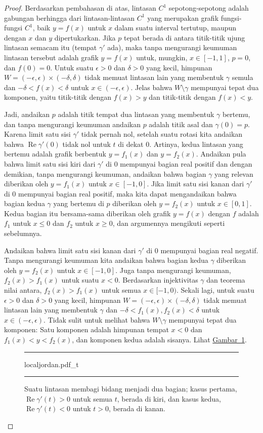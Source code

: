 \documentclass[12pt,openany]{book}
\renewcommand{\Re}{\operatorname{Re}}
\theoremstyle{plain}
\theoremstyle{remark}
\theoremstyle{definition}
\newenvironment{myfig}{%
\begin{figure}[h!t]
\noindent\rule{\textwidth}{0.5pt}\vspace{12pt}\par\centering}%
{\par\noindent\rule{\textwidth}{0.5pt}
\end{figure}}
\theoremstyle{exercise}
\theoremstyle{example}
\newcommand{\figureref}[1]{\hyperref[#1]{Gambar~\ref*{#1}}}
\begin{document}
\begin{proof}
Berdasarkan pembahasan di atas, lintasan $C^1$ sepotong-sepotong adalah gabungan berhingga dari lintasan-lintasan $C^1$
yang merupakan grafik fungsi-fungsi $C^1$, baik $y=f(x)$
untuk $x$ dalam suatu interval tertutup, maupun dengan $x$ dan $y$ dipertukarkan.
Jika $p$ tepat berada di antara titik-titik ujung lintasan semacam itu (tempat $\gamma'$ ada),
maka tanpa mengurangi keumuman lintasan tersebut adalah grafik $y=f(x)$ untuk, mungkin,
$x \in [-1,1]$, $p=0$, dan $f(0)=0$.
Untuk suatu $\epsilon > 0$ dan $\delta > 0$ yang kecil,
himpunan $W = (-\epsilon,\epsilon) \times (-\delta,\delta)$
tidak memuat lintasan lain yang membentuk $\gamma$ semula dan $-\delta < f(x) <
\delta$ untuk $x \in (-\epsilon,\epsilon)$. Jelas bahwa
$W \setminus \gamma$ mempunyai tepat dua komponen,
yaitu titik-titik dengan $f(x) > y$ dan titik-titik dengan $f(x) < y$.

Jadi, andaikan $p$ adalah titik tempat dua lintasan yang membentuk $\gamma$
bertemu, dan tanpa mengurangi keumuman andaikan $p$ adalah titik asal dan 
$\gamma(0) = p$.
Karena limit satu sisi $\gamma'$ tidak pernah nol, setelah
suatu rotasi kita andaikan bahwa $\Re \gamma'(0)$ tidak nol untuk 
$t$ di dekat $0$.
Artinya, kedua
lintasan yang bertemu adalah grafik berbentuk $y=f_1(x)$ dan $y=f_2(x)$.
Andaikan pula bahwa limit satu sisi
kiri dari $\gamma'$ di $0$ mempunyai bagian real positif dan dengan demikian,
tanpa mengurangi keumuman, andaikan bahwa
bagian $\gamma$ yang relevan diberikan oleh $y=f_1(x)$
untuk $x \in [-1,0]$.
Jika limit satu sisi kanan dari $\gamma'$ di $0$ mempunyai bagian real positif,
maka kita dapat mengandaikan bahwa bagian kedua $\gamma$
yang bertemu di $p$ diberikan oleh
$y=f_2(x)$ untuk $x \in [0,1]$.
Kedua bagian itu bersama-sama diberikan oleh grafik $y=f(x)$ dengan $f$ adalah $f_1$
untuk $x \leq 0$ dan $f_2$ untuk $x\geq 0$, dan argumennya mengikuti seperti
sebelumnya.

Andaikan bahwa limit satu sisi kanan dari $\gamma'$ di $0$
mempunyai bagian real negatif. Tanpa mengurangi keumuman kita andaikan
bahwa bagian kedua
$\gamma$ diberikan oleh $y=f_2(x)$ untuk $x \in [-1,0]$.
Juga tanpa mengurangi keumuman, $f_2(x) > f_1(x)$
untuk suatu $x < 0$.
Berdasarkan injektivitas $\gamma$ dan teorema nilai antara,
$f_2(x) > f_1(x)$ untuk semua $x \in [-1,0)$.
Sekali lagi, untuk suatu $\epsilon > 0$ dan $\delta > 0$ yang kecil,
himpunan
$W = (-\epsilon,\epsilon) \times (-\delta,\delta)$
tidak memuat lintasan lain yang membentuk $\gamma$
dan
$-\delta < f_1(x), f_2(x) < \delta$ untuk $x \in (-\epsilon,\epsilon)$.
Tidak sulit untuk melihat bahwa $W \setminus \gamma$
mempunyai tepat dua komponen:
Satu komponen adalah himpunan
tempat
$x < 0$ dan $f_1(x) < y < f_2(x)$,
dan komponen kedua adalah sisanya.
Lihat \figureref{fig:localjordan}.
\begin{myfig}
{localjordan.pdf_t}
\caption{Suatu lintasan membagi bidang menjadi dua bagian; kasus pertama, $\Re
\gamma'(t) > 0$ untuk semua $t$, berada di kiri, dan kasus kedua,
$\Re \gamma'(t) < 0$ untuk $t > 0$, berada di kanan.
\label{fig:localjordan}}
\end{myfig}
\end{proof}
\end{document}
